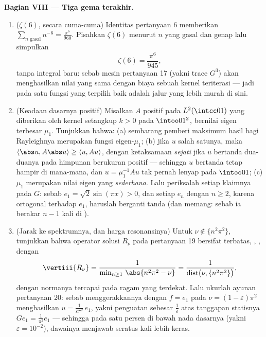\begin{problem}
\medskip
\noindent\textbf{Bagian VIII --- Tiga gema terakhir.}
\begin{enumerate}[resume]
  \item ($\zeta(6)$, secara cuma-cuma) Identitas 
        pertanyaan 6 memberikan $\sum_{n\text{ gasal}}n^{-6} =
        \frac{\pi^6}{960}$. Pisahkan $\zeta(6)$ menurut $n$ yang gasal dan
        genap lalu simpulkan
        \[
        \zeta(6) = \frac{\pi^6}{945},
        \]
        tanpa integral baru: sebab mesin pertanyaan 17
        (yakni trace $G^3$) akan menghasilkan nilai yang sama
        dengan biaya sebuah kernel teriterasi --- jadi  pada satu
        fungsi yang terpilih baik adalah jalur yang lebih murah di sini.
  \item (Keadaan dasarnya positif) Misalkan $A$ 
         positif pada $L^2(\intcc01)$
        yang diberikan oleh kernel setangkup  $k > 0$ pada
        $\intoo01^2$, bernilai eigen terbesar $\mu_1$. Tunjukkan bahwa:
        (a) sembarang pemberi maksimum hasil bagi Rayleighnya merupakan
        fungsi eigen-$\mu_1$; (b) jika $u$ salah satunya, maka
        $\langle\abs u, A\abs u\rangle \geq \langle u,
        Au\rangle$, dengan ketaksamaan \emph{sejati} jika $u$ bertanda
        dua-duanya pada himpunan berukuran positif --- sehingga $u$
        bertanda tetap hampir di mana-mana, dan $u = \mu_1^{-1}Au$
        tak pernah lenyap pada $\intoo01$; (c) $\mu_1$ merupakan
        nilai eigen yang \emph{sederhana}. Lalu periksalah setiap klaimnya pada $G$:
        sebab $e_1 = \sqrt2\sin(\pi x) > 0$, dan setiap $e_n$ dengan $n
        \geq 2$, karena ortogonal terhadap $e_1$, haruslah berganti tanda
        (dan memang: sebab ia berakar $n - 1$ kali di ).
  \item (Jarak ke spektrumnya, dan harga
        resonansinya) Untuk $\nu \notin \{n^2\pi^2\}$, tunjukkan bahwa
        operator solusi $R_\nu$ pada pertanyaan 19 bersifat
        terbatas, , , dengan
        \[
        \vertiii{R_\nu} =
        \frac1{\min_{n\geq1}\,\abs{n^2\pi^2 - \nu}}
        = \frac1{\operatorname{dist}\bigl(\nu,
        \{n^2\pi^2\}\bigr)},
        \]
        dengan normanya tercapai pada ragam yang terdekat. Lalu
        ukurlah ayunan pertanyaan 20: sebab menggerakkannya dengan $f = e_1$
        pada $\nu = (1 - \varepsilon)\pi^2$ menghasilkan $u =
        \frac{1}{\varepsilon\pi^2}\,e_1$, yakni penguatan sebesar
        $\frac1\varepsilon$ atas tanggapan statisnya $Ge_1 =
        \frac1{\pi^2}e_1$ --- sehingga pada satu persen di bawah
        nada dasarnya (yakni $\varepsilon = 10^{-2}$), dawainya
        menjawab seratus kali lebih keras.

\end{enumerate}
\end{problem}
